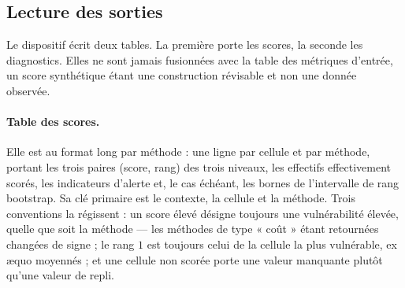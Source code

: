 \documentclass[11pt,a4paper]{article}
\theoremstyle{definition}
\theoremstyle{remark}
\begin{document}
\bigskip

\subsection{Lecture des sorties}
\label{sec:app-lecture}

\medskip

Le dispositif écrit deux tables. La première porte les scores, la seconde les diagnostics.
Elles ne sont jamais fusionnées avec la table des métriques d'entrée, un score synthétique
étant une construction révisable et non une donnée observée.

\bigskip

\paragraph{Table des scores.} Elle est au format long par méthode : une ligne par cellule
et par méthode, portant les trois paires (score, rang) des trois niveaux, les effectifs
effectivement scorés, les indicateurs d'alerte et, le cas échéant, les bornes de
l'intervalle de rang bootstrap. Sa clé primaire est le contexte, la cellule et la méthode.
Trois conventions la régissent : un score élevé désigne toujours une vulnérabilité élevée,
quelle que soit la méthode --- les méthodes de type « coût » étant retournées changées de
signe ; le rang $1$ est toujours celui de la cellule la plus vulnérable, ex \ae quo
moyennés ; et une cellule non scorée porte une valeur manquante plutôt qu'une valeur de
repli.

\medskip
\end{document}
